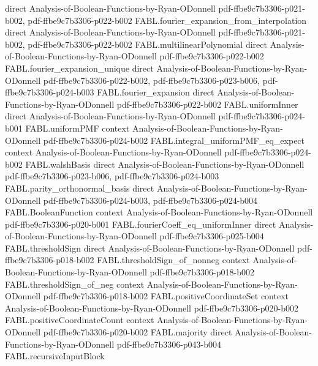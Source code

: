 \begin{theorem}
  {direct}
  {Analysis-of-Boolean-Functions-by-Ryan-ODonnell}
  {pdf-ffbe9c7b3306-p021-b002,
    pdf-ffbe9c7b3306-p022-b002}
\proofstep
  {FABL.fourier_expansion_from_interpolation}
  {direct}
  {Analysis-of-Boolean-Functions-by-Ryan-ODonnell}
  {pdf-ffbe9c7b3306-p021-b002,
    pdf-ffbe9c7b3306-p022-b002}
\proofstep
  {FABL.multilinearPolynomial}
  {direct}
  {Analysis-of-Boolean-Functions-by-Ryan-ODonnell}
  {pdf-ffbe9c7b3306-p022-b002}
\proofstep
  {FABL.fourier_expansion_unique}
  {direct}
  {Analysis-of-Boolean-Functions-by-Ryan-ODonnell}
  {pdf-ffbe9c7b3306-p022-b002,
    pdf-ffbe9c7b3306-p023-b006,
    pdf-ffbe9c7b3306-p024-b003}
\proofstep
  {FABL.fourier_expansion}
  {direct}
  {Analysis-of-Boolean-Functions-by-Ryan-ODonnell}
  {pdf-ffbe9c7b3306-p022-b002}
\proofstep
  {FABL.uniformInner}
  {direct}
  {Analysis-of-Boolean-Functions-by-Ryan-ODonnell}
  {pdf-ffbe9c7b3306-p024-b001}
\proofstep
  {FABL.uniformPMF}
  {context}
  {Analysis-of-Boolean-Functions-by-Ryan-ODonnell}
  {pdf-ffbe9c7b3306-p024-b002}
\proofstep
  {FABL.integral_uniformPMF_eq_expect}
  {context}
  {Analysis-of-Boolean-Functions-by-Ryan-ODonnell}
  {pdf-ffbe9c7b3306-p024-b002}
\proofstep
  {FABL.walshBasis}
  {direct}
  {Analysis-of-Boolean-Functions-by-Ryan-ODonnell}
  {pdf-ffbe9c7b3306-p023-b006,
    pdf-ffbe9c7b3306-p024-b003}
\proofstep
  {FABL.parity_orthonormal_basis}
  {direct}
  {Analysis-of-Boolean-Functions-by-Ryan-ODonnell}
  {pdf-ffbe9c7b3306-p024-b003,
    pdf-ffbe9c7b3306-p024-b004}
\proofstep
  {FABL.BooleanFunction}
  {context}
  {Analysis-of-Boolean-Functions-by-Ryan-ODonnell}
  {pdf-ffbe9c7b3306-p020-b001}
\proofstep
  {FABL.fourierCoeff_eq_uniformInner}
  {direct}
  {Analysis-of-Boolean-Functions-by-Ryan-ODonnell}
  {pdf-ffbe9c7b3306-p025-b004}
\proofstep
  {FABL.thresholdSign}
  {direct}
  {Analysis-of-Boolean-Functions-by-Ryan-ODonnell}
  {pdf-ffbe9c7b3306-p018-b002}
\proofstep
  {FABL.thresholdSign_of_nonneg}
  {context}
  {Analysis-of-Boolean-Functions-by-Ryan-ODonnell}
  {pdf-ffbe9c7b3306-p018-b002}
\proofstep
  {FABL.thresholdSign_of_neg}
  {context}
  {Analysis-of-Boolean-Functions-by-Ryan-ODonnell}
  {pdf-ffbe9c7b3306-p018-b002}
\proofstep
  {FABL.positiveCoordinateSet}
  {context}
  {Analysis-of-Boolean-Functions-by-Ryan-ODonnell}
  {pdf-ffbe9c7b3306-p020-b002}
\proofstep
  {FABL.positiveCoordinateCount}
  {context}
  {Analysis-of-Boolean-Functions-by-Ryan-ODonnell}
  {pdf-ffbe9c7b3306-p020-b002}
\proofstep
  {FABL.majority}
  {direct}
  {Analysis-of-Boolean-Functions-by-Ryan-ODonnell}
  {pdf-ffbe9c7b3306-p043-b004}
\proofstep
  {FABL.recursiveInputBlock}

\end{theorem}
